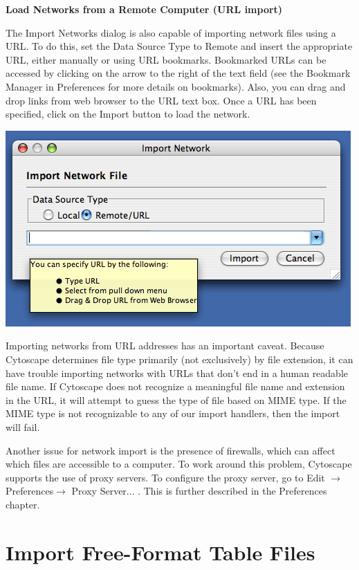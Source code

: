  
\textbf{Load Networks from a Remote Computer (URL import)}


 The Import Networks dialog is also capable of importing network files using a URL. To do this, set the Data Source Type to Remote and insert the appropriate URL, either manually or using URL bookmarks. Bookmarked URLs can be accessed by clicking on the arrow to the right of the text field (see the Bookmark Manager in Preferences for more details on bookmarks). Also, you can drag and drop links from web browser to the URL text box. Once a URL has been specified, click on the Import button to load the network. 


 \includegraphics[wdith=\textwidth]{images/network_import_dialog2_25.png} 


 Importing networks from URL addresses has an important caveat. Because Cytoscape determines file type primarily (not exclusively) by file extension, it can have trouble importing networks with URLs that don't end in a human readable file name. If Cytoscape does not recognize a meaningful file name and extension in the URL, it will attempt to guess the type of file based on MIME type. If the MIME type is not recognizable to any of our import handlers, then the import will fail. 


 Another issue for network import is the presence of firewalls, which can affect which files are accessible to a computer. To work around this problem, Cytoscape supports the use of proxy servers. To configure the proxy server, go to Edit $\rightarrow$ Preferences$\rightarrow$ Proxy Server... . This is further described in the Preferences chapter. 


  

\section{Import Free-Format Table Files}


